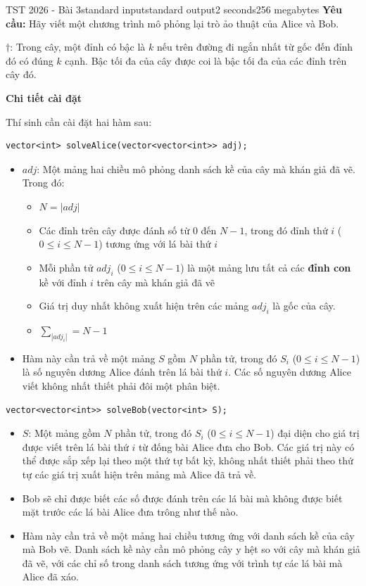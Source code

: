 \begin{problem}{TST 2026 - Bài 3}{standard input}{standard output}{2 seconds}{256 megabytes}
\textbf{Yêu cầu:} Hãy viết một chương trình mô phỏng lại trò ảo thuật của Alice và Bob.

$\dagger$: Trong cây, một đỉnh có bậc là $k$ nếu trên đường đi ngắn nhất từ gốc đến đỉnh đó có đúng $k$ cạnh. Bậc tối đa của cây được coi là bậc tối đa của các đỉnh trên cây đó.

\InputFile
\textbf{Chi tiết cài đặt}

Thí sinh cần cài đặt hai hàm sau:

\begin{lstlisting}
vector<int> solveAlice(vector<vector<int>> adj);
\end{lstlisting}

\begin{itemize}
   \item $adj$: Một mảng hai chiều mô phỏng danh sách kề của cây mà khán giả đã vẽ. Trong đó:
   \begin{itemize}
      \item $N=|adj|$
      \item Các đỉnh trên cây được đánh số từ $0$ đến $N-1$, trong đó đỉnh thứ $i$ ($0\le i\le N-1$) tương ứng với lá bài thứ $i$
      \item Mỗi phần tử $adj_i$ ($0\le i\le N-1$) là một mảng lưu tất cả các \textbf{đỉnh con} kề với đỉnh $i$ trên cây mà khán giả đã vẽ
      \item Giá trị duy nhất không xuất hiện trên các mảng $adj_i$ là gốc của cây.
      \item $\sum_{|adj_i|}=N-1$
   \end{itemize}
   \item Hàm này cần trả về một mảng $S$ gồm $N$ phần tử, trong đó $S_i$ ($0\le i\le N-1$) là số nguyên dương Alice đánh trên lá bài thứ $i$. Các số nguyên dương Alice viết không nhất thiết phải đôi một phân biệt.
\end{itemize}

\begin{lstlisting}
vector<vector<int>> solveBob(vector<int> S);
\end{lstlisting}

\begin{itemize}
   \item $S$: Một mảng gồm $N$ phần tử, trong đó $S_i$ ($0\le i\le N-1$) đại diện cho giá trị được viết trên lá bài thứ $i$ từ đống bài Alice đưa cho Bob. Các giá trị này có thể được sắp xếp lại theo một thứ tự bất kỳ, không nhất thiết phải theo thứ tự các giá trị xuất hiện trên mảng mà Alice đã trả về.
   \item Bob sẽ chỉ được biết các số được đánh trên các lá bài mà không được biết mặt trước các lá bài Alice đưa trông như thế nào.
   \item Hàm này cần trả về một mảng hai chiều tương ứng với danh sách kề của cây mà Bob vẽ. Danh sách kề này cần mô phỏng cây y hệt so với cây mà khán giả đã vẽ, với các chỉ số trong danh sách tương ứng với trình tự các lá bài mà Alice đã xáo.
\end{itemize}


\end{problem}
